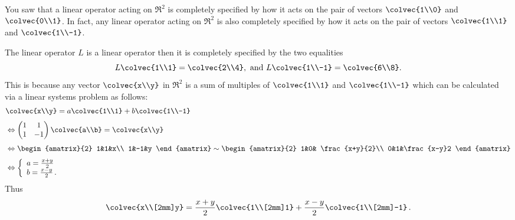 You saw that a linear operator acting on $\Re^2$ is completely specified by how it acts on the pair of vectors $\colvec{1\\0}$ and $\colvec{0\\1}$. 
In fact, any linear operator acting on $\Re^2$ is also completely specified by how it acts on the pair of vectors $\colvec{1\\1}$ and $\colvec{1\\-1}$.

\begin{example} The linear operator $L$ is a linear operator then it is completely specified \hypertarget{nonstandard r2 basis}{by the two equalities} 
\[
L\colvec{1\\1}= \colvec{2\\4}, \text{~and~} L\colvec{1\\-1}=\colvec{6\\8}.
\] 
This is because any vector $\colvec{x\\y}$ in $\Re^2$ is a sum of multiples of
$\colvec{1\\1}$ and $\colvec{1\\-1}$ which can be calculated via a linear systems problem as follows:
\begin{align*}&
\colvec{x\\y}=a\colvec{1\\1}+b\colvec{1\\-1}\\[1mm]
&\Leftrightarrow
\begin{pmatrix}
1&1\\
1&-1
\end{pmatrix}
\colvec{a\\b}
=\colvec{x\\y}\\[1mm]
&\Leftrightarrow 
\begin{amatrix}{2}
1&1&x\\
1&-1&y
\end{amatrix}
\sim \begin{amatrix}{2}
1&0& \frac{x+y}{2}\\
0&1&\frac{x-y}2
\end{amatrix}\\[1mm]
&\Leftrightarrow
\left\{ 
\begin{array}{l}
a=\frac{x+y}{2}\\
b=\frac{x-y}{2}\, .
\end{array}
\right.
\end{align*}
Thus
\[
\colvec{x\\[2mm]y}=\frac{x+y}{2}\colvec{1\\[2mm]1}+\frac{x-y}{2}\colvec{1\\[2mm]-1}\, .
\]
\end{example}
